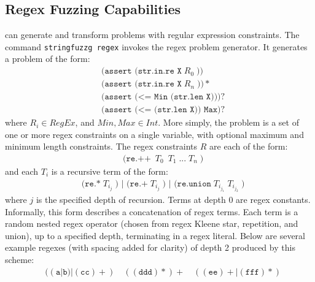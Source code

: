


    \subsection{Regex Fuzzing Capabilities}

        \fuzzer{} can generate and transform problems with regular expression constraints. The command \texttt{stringfuzzg regex} invokes the regex problem generator. It generates a problem of the form: %
        \begingroup
        \footnotesize
        \begin{align*}
            & \texttt{(assert (str.in.re X}\; R_0\; \texttt{))} \\
            & \texttt{(assert (str.in.re X}\; R_n\; \texttt{))}* \\
            & \texttt{(assert (<= Min (str.len X)))}? \\
            & \texttt{(assert (<= (str.len X)) Max)}?
        \end{align*}
        \endgroup
        where $R_i \in RegEx$, and $Min, Max \in Int$. More simply, the problem is a set of one or more regex constraints on a single variable, with optional maximum and minimum length constraints. The regex constraints $R$ are each of the form:
        \begingroup
        \footnotesize
        \begin{align*}
            & \texttt{(re.++}\; \ T_0\; \  T_1\; \texttt{...}\; T_n\; \texttt{)}
        \end{align*}
        \endgroup
        and each $T_i$ is a recursive term of the form:
        \begingroup
        \footnotesize
        \begin{align*}
            & \texttt{(re.*}\; T_{i_j}\; \texttt{) | (re.+}\; T_{i_j}\; \texttt{) | (re.union}\; T_{i_{j_1}}\; T_{i_{j_2}}\; \texttt{)}
        \end{align*}
        \endgroup
        where $j$  is the specified depth of recursion. Terms at depth 0 are regex constants. Informally, this form describes a concatenation of regex terms. Each term is a random nested regex operator (chosen from regex Kleene star, repetition, and union), up to a specified depth, terminating in a regex literal. Below are several example regexes (with spacing added for clarity) of depth 2 produced by this scheme:
        \begingroup
        \footnotesize
        \begin{align*}
            & ((\texttt{a}|\texttt{b})|(\texttt{cc})+)\quad ((\texttt{ddd})*)+\quad ((\texttt{ee})+|(\texttt{fff})*)
        \end{align*}
        \endgroup

